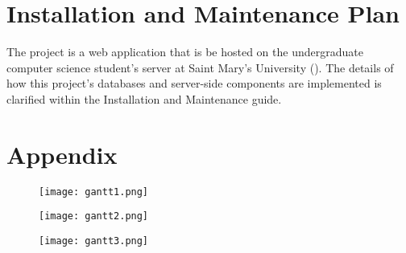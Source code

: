 \documentclass[11pt]{article}
\newcommand{\MYhref}[3][blue]{\href{#2}{\color{#1}{#3}}}%
\begin{document}
\section{Installation and Maintenance Plan}

The project is a web application that is be hosted on the undergraduate computer science student's
server at Saint Mary's University (\MYhref{https://ugdev.cs.smu.ca/~group4}{link}). The details of
how this project's databases and server-side components are implemented is clarified within the
Installation and Maintenance guide.

\pagebreak
\section*{Appendix}

\begin{figure}[H]
\texttt{[image: gantt1.png]}
\centering
\end{figure}

\begin{figure}[H]
\texttt{[image: gantt2.png]}
\centering
\end{figure}

\begin{figure}[H]
\texttt{[image: gantt3.png]}
\centering
\end{figure}
\end{document}

